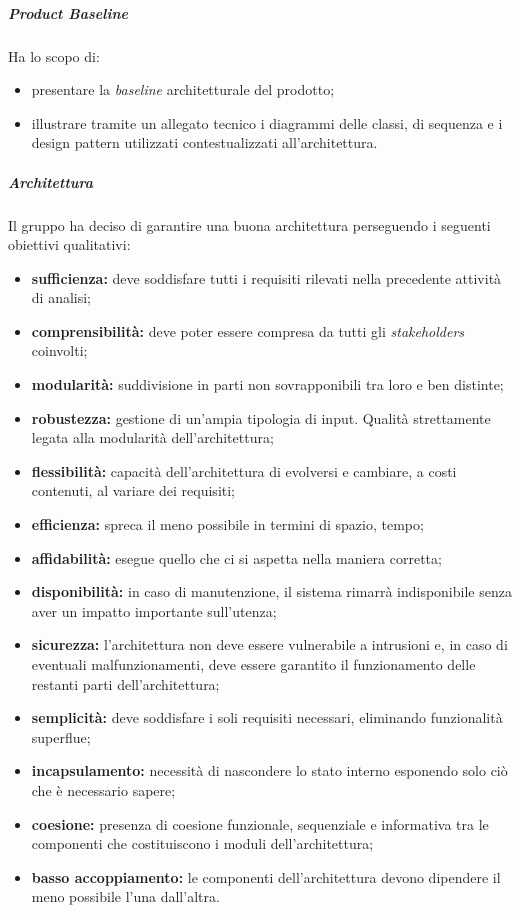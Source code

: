 \subparagraph*{Product Baseline\glo}
Ha lo scopo di:
\begin{itemize}
	\item presentare la \textit{baseline\glo} architetturale del prodotto;
	\item illustrare tramite un allegato tecnico i diagrammi delle classi, di sequenza e i design pattern utilizzati contestualizzati all'architettura.
\end{itemize}
\subparagraph*{Architettura}
Il gruppo ha deciso di garantire una buona architettura perseguendo i seguenti obiettivi qualitativi:
\begin{itemize}
	\item \textbf{sufficienza:} deve soddisfare tutti i requisiti rilevati nella precedente attività di analisi;
	\item \textbf{comprensibilità:} deve poter essere compresa da tutti gli \textit{stakeholders\glo} coinvolti;
	\item \textbf{modularità:} suddivisione in parti non sovrapponibili tra loro e ben distinte;
	\item \textbf{robustezza:} gestione di un'ampia tipologia di input. Qualità strettamente legata alla modularità dell'architettura;
	\item \textbf{flessibilità:} capacità dell'architettura di evolversi e cambiare, a costi contenuti, al variare dei requisiti;
	\item \textbf{efficienza:} spreca il meno possibile in termini di spazio, tempo;
	\item \textbf{affidabilità:} esegue quello che ci si aspetta nella maniera corretta;
	\item \textbf{disponibilità:} in caso di manutenzione, il sistema rimarrà indisponibile senza aver un impatto importante sull'utenza;
	\item \textbf{sicurezza:} l'architettura non deve essere vulnerabile a intrusioni e, in caso di eventuali malfunzionamenti, deve essere garantito il funzionamento delle restanti parti dell'architettura;
	\item \textbf{semplicità:} deve soddisfare i soli requisiti necessari, eliminando funzionalità superflue;
	\item \textbf{incapsulamento:} necessità di nascondere lo stato interno esponendo solo ciò che è necessario sapere;
	\item \textbf{coesione:} presenza di coesione funzionale, sequenziale e informativa tra le componenti che costituiscono i moduli dell'architettura;
	\item \textbf{basso accoppiamento:} le componenti dell'architettura devono dipendere il meno possibile l'una dall'altra.	
\end{itemize}

